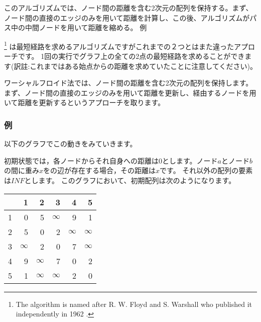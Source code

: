 
このアルゴリズムでは、ノード間の距離を含む2次元の配列を保持する。まず、ノード間の直接のエッジのみを用いて距離を計算し、この後、アルゴリズムがパス中の中間ノードを用いて距離を縮める。
例

\footnote{The algorithm
is named after R. W. Floyd and S. Warshall
who published it independently in 1962 \cite{flo62,war62}.}
は最短経路を求めるアルゴリズムですがこれまでの２つとはまた違ったアプローチです。
1回の実行でグラフ上の全ての2点の最短経路を求めることができます(訳註:これまではある始点からの距離を求めていたことに注意してください)。

ワーシャルフロイド法では、ノード間の距離を含む2次元の配列を保持します。
まず、ノード間の直接のエッジのみを用いて距離を更新し、経由するノードを用いて距離を更新するというアプローチを取ります。

\subsubsection{例}
以下のグラフでこの動きをみていきます。

\begin{center}
\end{center}

初期状態では，各ノードからそれ自身への距離は$0$とします。ノード$a$とノード$b$の間に重み$x$をの辺が存在する場合，その距離は$x$です。
それ以外の配列の要素は$INF$とします。
このグラフにおいて、初期配列は次のようになります。

\begin{center}
\begin{tabular}{r|rrrrr}
 & 1 & 2 & 3 & 4 & 5 \\
\hline
1 & 0 & 5 & $\infty$ & 9 & 1 \\
2 & 5 & 0 & 2 & $\infty$ & $\infty$ \\
3 & $\infty$ & 2 & 0 & 7 & $\infty$ \\
4 & 9 & $\infty$ & 7 & 0 & 2 \\
5 & 1 & $\infty$ & $\infty$ & 2 & 0 \\
\end{tabular}
\end{center}
\vspace{10pt}

